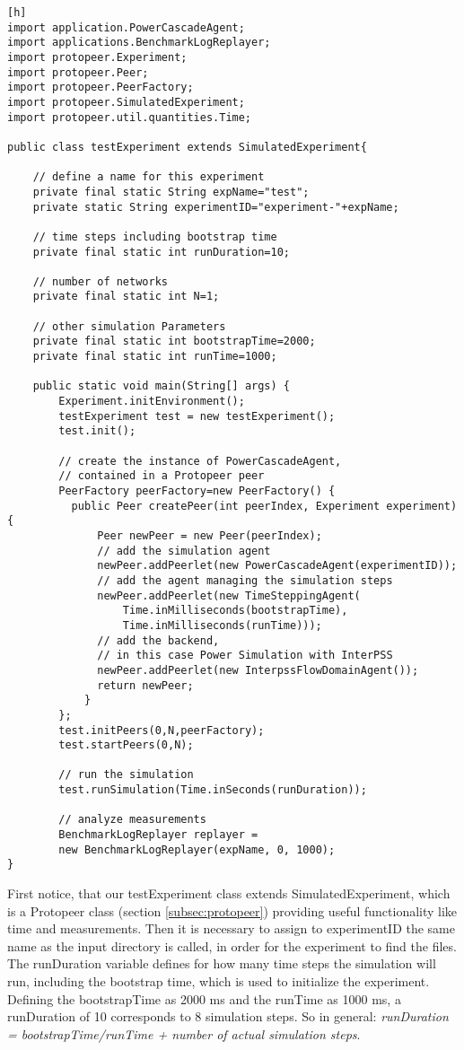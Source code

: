 \documentclass[11pt,fleqn]{book} %
\begin{document}
\begin{lstlisting}[frame=single][h]
import application.PowerCascadeAgent;
import applications.BenchmarkLogReplayer;
import protopeer.Experiment;
import protopeer.Peer;
import protopeer.PeerFactory;
import protopeer.SimulatedExperiment;
import protopeer.util.quantities.Time;

public class testExperiment extends SimulatedExperiment{    

    // define a name for this experiment
    private final static String expName="test";    
    private static String experimentID="experiment-"+expName;
    
    // time steps including bootstrap time
    private final static int runDuration=10;

    // number of networks
    private final static int N=1;
	    
    // other simulation Parameters
    private final static int bootstrapTime=2000;
    private final static int runTime=1000;
    
    public static void main(String[] args) {
        Experiment.initEnvironment();
        testExperiment test = new testExperiment();
        test.init();
        
        // create the instance of PowerCascadeAgent, 
        // contained in a Protopeer peer
        PeerFactory peerFactory=new PeerFactory() {
          public Peer createPeer(int peerIndex, Experiment experiment){
              Peer newPeer = new Peer(peerIndex);
              // add the simulation agent
              newPeer.addPeerlet(new PowerCascadeAgent(experimentID));
              // add the agent managing the simulation steps
              newPeer.addPeerlet(new TimeSteppingAgent(
                  Time.inMilliseconds(bootstrapTime),
                  Time.inMilliseconds(runTime)));
              // add the backend, 
              // in this case Power Simulation with InterPSS
              newPeer.addPeerlet(new InterpssFlowDomainAgent());
              return newPeer;
            }
        };
        test.initPeers(0,N,peerFactory);
        test.startPeers(0,N);

        // run the simulation
        test.runSimulation(Time.inSeconds(runDuration));

        // analyze measurements
        BenchmarkLogReplayer replayer =
        new BenchmarkLogReplayer(expName, 0, 1000);
}
	\end{lstlisting}
First notice, that our testExperiment class extends SimulatedExperiment, which is a Protopeer class (section \ref{subsec:protopeer}) providing useful functionality like time and measurements. Then it is necessary to assign to experimentID the same name as the input directory is called, in order for the experiment to find the files. The runDuration variable defines for how many time steps the simulation will run, including the bootstrap time, which is used to initialize the experiment. Defining the bootstrapTime as 2000 ms and the runTime as 1000 ms, a runDuration of 10 corresponds to 8 simulation steps. So in general: \textit{runDuration = bootstrapTime/runTime + number of actual simulation steps}. 
\end{document}
